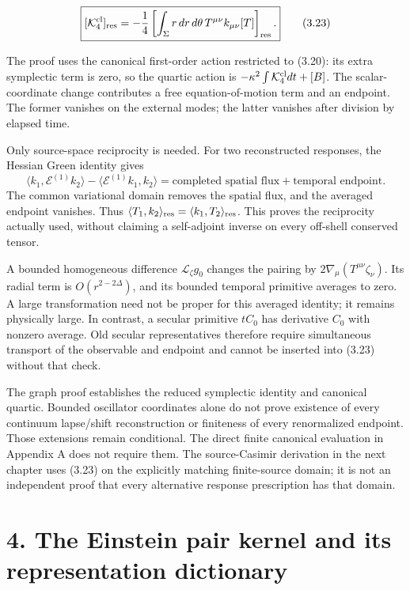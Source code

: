 \[
\boxed{
[\mathcal K_4^{\rm cl}]_{\rm res}
=-\frac14\left[
\int_\Sigma r\,dr\,d\theta\,
T^{\mu\nu}k_{\mu\nu}[T]\right]_{\rm res}.
}
\tag{3.23}
\]

The proof uses the canonical first-order action restricted to (3.20): its extra symplectic term is zero, so the quartic action is \(-\kappa^2\int\mathcal K_4^{\rm cl}dt+[B]\). The scalar-coordinate change contributes a free equation-of-motion term and an endpoint. The former vanishes on the external modes; the latter vanishes after division by elapsed time.

Only source-space reciprocity is needed. For two reconstructed responses, the Hessian Green identity gives \[
\langle k_1,\mathcal E^{(1)}k_2\rangle
-\langle\mathcal E^{(1)}k_1,k_2\rangle
=\text{completed spatial flux}+\text{temporal endpoint}.
\] The common variational domain removes the spatial flux, and the averaged endpoint vanishes. Thus \(\langle T_1,k_2\rangle_{\rm res} =\langle k_1,T_2\rangle_{\rm res}\). This proves the reciprocity actually used, without claiming a self-adjoint inverse on every off-shell conserved tensor.

A bounded homogeneous difference \(\mathcal L_\zeta g_0\) changes the pairing by \(2\nabla_\mu(T^{\mu\nu}\zeta_\nu)\). Its radial term is \(O(r^{2-2\Delta})\), and its bounded temporal primitive averages to zero. A large transformation need not be proper for this averaged identity; it remains physically large. In contrast, a secular primitive \(tC_0\) has derivative \(C_0\) with nonzero average. Old secular representatives therefore require simultaneous transport of the observable and endpoint and cannot be inserted into (3.23) without that check.

The graph proof establishes the reduced symplectic identity and canonical quartic. Bounded oscillator coordinates alone do not prove existence of every continuum lapse/shift reconstruction or finiteness of every renormalized endpoint. Those extensions remain conditional. The direct finite canonical evaluation in Appendix A does not require them. The source-Casimir derivation in the next chapter uses (3.23) on the explicitly matching finite-source domain; it is not an independent proof that every alternative response prescription has that domain.

\clearpage
\hypertarget{the-einstein-pair-kernel-and-its-representation-dictionary}{%
\section{4. The Einstein pair kernel and its representation dictionary}\label{the-einstein-pair-kernel-and-its-representation-dictionary}}

